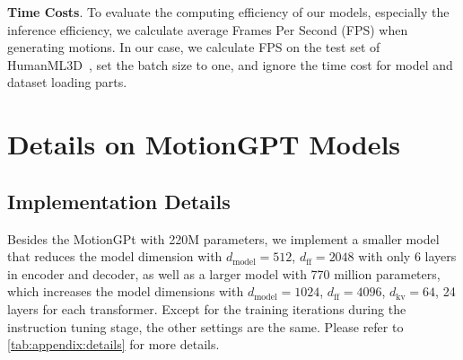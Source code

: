 \textbf{Time Costs}. To evaluate the computing efficiency of our models, especially the inference efficiency, we calculate average Frames Per Second (FPS) when generating motions.  In our case, we calculate FPS on the test set of HumanML3D~\cite{Guo_2022_CVPR_humanml3d}, set the batch size to one, and ignore the time cost for model and dataset loading parts.


\section{Details on MotionGPT Models}
\label{sec:appendix:model:details}


\subsection{Implementation Details}
Besides the MotionGPt with 220M parameters, we implement a smaller model that reduces the model dimension with $d_{\text{model}} = 512$, $d_\text{ff} = 2048$ with only 6 layers in encoder and decoder, as well as a larger model with 770 million parameters, which increases the model dimensions with $d_\text{model} = 1024$, $d_\text{ff} = 4096$, $d_\text{kv} = 64$, 24 layers for each transformer. Except for the training iterations during the instruction tuning stage, the other settings are the same. Please refer to \cref{tab:appendix:details} for more details.



